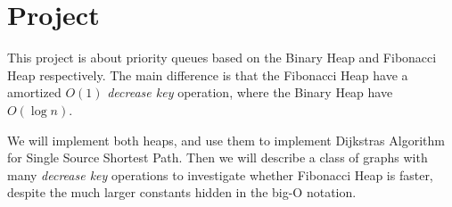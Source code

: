 \section*{Project}
This project is about priority queues based on the Binary Heap and Fibonacci Heap respectively. The main difference is that the Fibonacci Heap have a amortized $O(1)$ \textit{decrease key} operation, where the Binary Heap have $O(\log n)$.

We will implement both heaps, and use them to implement Dijkstras Algorithm for Single Source Shortest Path. Then we will describe a class of graphs with many \textit{decrease key} operations to investigate whether Fibonacci Heap is faster, despite the much larger constants hidden in the big-O notation.
